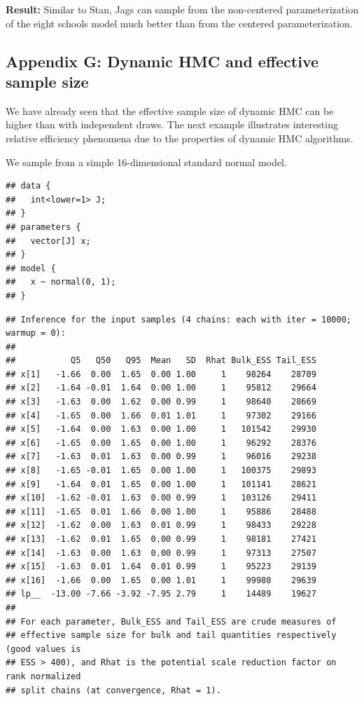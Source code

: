 \documentclass[american,]{article}
\begin{document}
\textbf{Result:} Similar to Stan, Jags can sample from the non-centered
parameterization of the eight schools model much better than from the
centered parameterization.

\hypertarget{AppendixG}{%
\subsection*{Appendix G: Dynamic HMC and effective sample
size}\label{AppendixG}}

We have already seen that the effective sample size of dynamic HMC can
be higher than with independent draws. The next example illustrates
interesting relative efficiency phenomena due to the properties of
dynamic HMC algorithms.

We sample from a simple 16-dimensional standard normal model.

\begin{verbatim}
## data {
##   int<lower=1> J;
## }
## parameters {
##   vector[J] x;
## }
## model {
##   x ~ normal(0, 1);
## }
\end{verbatim}

\begin{verbatim}
## Inference for the input samples (4 chains: each with iter = 10000; warmup = 0):
## 
##           Q5   Q50   Q95  Mean   SD  Rhat Bulk_ESS Tail_ESS
## x[1]   -1.66  0.00  1.65  0.00 1.00     1    98264    28709
## x[2]   -1.64 -0.01  1.64  0.00 1.00     1    95812    29664
## x[3]   -1.63  0.00  1.62  0.00 0.99     1    98640    28669
## x[4]   -1.65  0.00  1.66  0.01 1.01     1    97302    29166
## x[5]   -1.64  0.00  1.63  0.00 1.00     1   101542    29930
## x[6]   -1.65  0.00  1.65  0.00 1.00     1    96292    28376
## x[7]   -1.63  0.01  1.63  0.00 0.99     1    96016    29238
## x[8]   -1.65 -0.01  1.65  0.00 1.00     1   100375    29893
## x[9]   -1.64  0.01  1.65  0.00 1.00     1   101141    28621
## x[10]  -1.62 -0.01  1.63  0.00 0.99     1   103126    29411
## x[11]  -1.65  0.01  1.66  0.00 1.00     1    95886    28488
## x[12]  -1.62  0.00  1.63  0.01 0.99     1    98433    29228
## x[13]  -1.62  0.01  1.65  0.00 0.99     1    98181    27421
## x[14]  -1.63  0.00  1.63  0.00 0.99     1    97313    27507
## x[15]  -1.63  0.01  1.64  0.01 0.99     1    95223    29139
## x[16]  -1.66  0.00  1.65  0.00 1.01     1    99980    29639
## lp__  -13.00 -7.66 -3.92 -7.95 2.79     1    14489    19627
## 
## For each parameter, Bulk_ESS and Tail_ESS are crude measures of 
## effective sample size for bulk and tail quantities respectively (good values is 
## ESS > 400), and Rhat is the potential scale reduction factor on rank normalized
## split chains (at convergence, Rhat = 1).
\end{verbatim}
\end{document}

